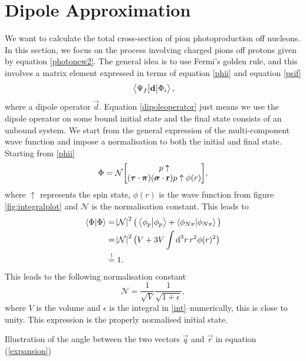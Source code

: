 \section{Dipole Approximation}\label{sec:dipoleapprox}
We want to calculate the total cross-section of pion photoproduction off nucleons. In this section, we focus on the process involving charged pions off protons given by equation \eqref{photonew2}. The general idea is to use Fermi's golden rule, and this involves a matrix element expressed in terms of equation \eqref{phii} and equation \eqref{psif}
\begin{equation}\label{dipoleoperator}
	\mel{\Psi_f}{\bm{\mathrm{d}}}{\Phi_i},
\end{equation}
where a dipole operator $\vec{d}$. Equation \eqref{dipoleoperator} just means we use the dipole operator on some bound initial state and the final state consists of an unbound system. We start from the general expression of the multi-component wave function and impose a normalisation to both the initial and final state. Starting from \eqref{phii}
\begin{align}\label{finalphi}
	\Phi = \mathcal{N} \mqty[p\uparrow \\ (\vec{\tau}\cdot \vec{\pi})(\vec{\sigma}\cdot \vec{r})p\uparrow \phi(r)],
\end{align}
where $\uparrow$ represents the spin state, $\phi(r)$ is the wave function from figure \ref{fig:integralplot} and $\mathcal{N}$ is the normalisation constant. This leads to
\begin{align}
	\braket{\Phi}{\Phi} &= \abs{\mathcal{N}}^2 \big( \braket{\phi_p}{\phi_p}+ \braket{\phi_{N\pi}}{\phi_{N\pi}} \big) \\
	&= \abs{\mathcal{N}}^2 \big( V+3V\int \text{d}^3r \, r^2 \phi(r)^2 \big)\label{int} \\
	&\stackrel{!}{=} 1.
\end{align} 
This leads to the following normalisation constant
\begin{equation}
	\mathcal{N} = \frac{1}{\sqrt{V}}\frac{1}{\sqrt{1+\epsilon}},
\end{equation}
where $V$ is the volume and $\epsilon$ is the integral in \eqref{int}--numerically, this is close to unity. This expression is the properly normalised initial state. 
\begin{marginfigure}
	\centering
	
	\caption{Illustration of the angle between the two vectors $\vec{q}$ and $\vec{r}$ in equation (\ref{expansion})}
	\label{normsphere}
\end{marginfigure}
